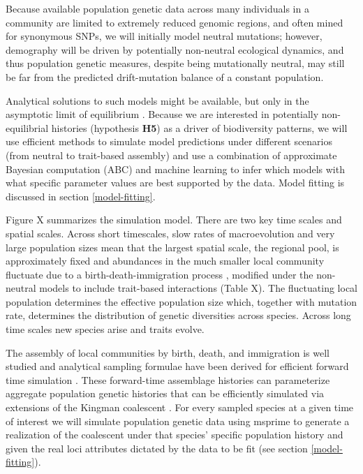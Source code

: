 \documentclass[11pt]{article}
\begin{document}
Because available population genetic data across many individuals in a
community are limited to extremely reduced genomic regions, and often
mined for synonymous SNPs, we will initially model neutral mutations;
however, demography will be driven by potentially non-neutral ecological
dynamics, and thus population genetic measures, despite being
mutationally neutral, may still be far from the predicted drift-mutation
balance of a constant population.

Analytical solutions to such models might be available, but only in
the asymptotic limit of equilibrium \citep[e.g.,][]{Etienne2007-we,
  Rosindell2015-gp}. Because we are interested in potentially
non-equilibrial histories (hypothesis \textbf{H5}) as a driver of
biodiversity patterns, we will use efficient methods to simulate model
predictions under different scenarios (from neutral to trait-based
assembly) and use a combination of approximate Bayesian computation
(ABC) and machine learning to infer which models with what specific
parameter values are best supported by the data. Model fitting is
discussed in section \ref{model-fitting}.

Figure X summarizes the simulation model. There are two key time scales
and spatial scales. Across short timescales, slow rates of
macroevolution and very large population sizes mean that the largest
spatial scale, the regional pool, is approximately fixed and abundances
in the much smaller local community fluctuate due to a
birth-death-immigration process \cite{Kendall1948-ri}, modified under
the non-neutral models to include trait-based interactions (Table X).
The fluctuating local population determines the effective population
size which, together with mutation rate, determines the distribution of
genetic diversities across species. Across long time scales new species
arise and traits evolve.

The assembly of local communities by birth, death, and immigration is
well studied and analytical sampling formulae have been derived for
efficient forward time simulation \cite{Haegeman2017-kf,Kendall1948-ri}.
These forward-time assemblage histories can parameterize aggregate
population genetic histories that can be efficiently simulated via
extensions of the Kingman coalescent \cite{Rosenberg2002-vb}. For every
sampled species at a given time of interest we will simulate population
genetic data using msprime \cite{Kelleher2016-an} to generate a
realization of the coalescent under that species' specific population
history and given the real loci attributes dictated by the data to be
fit (see section \ref{model-fitting}).
\end{document}
